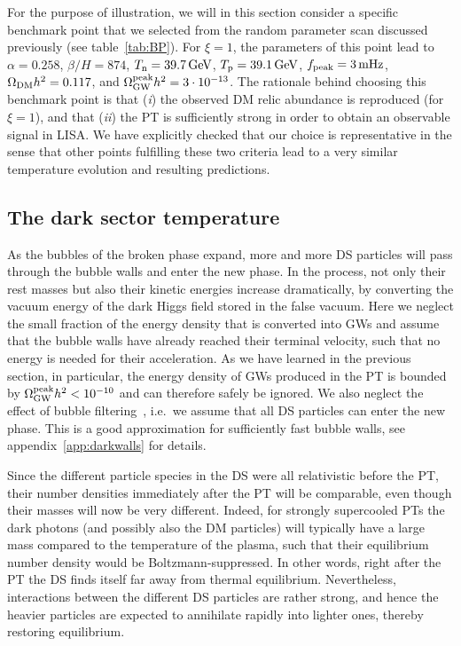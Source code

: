 For the purpose of illustration, we will in this section consider a specific benchmark point that we selected from the random parameter scan discussed previously (see table~\ref{tab:BP}). For $\xi=1$, the parameters of this point lead to $\alpha = 0.258$, $\beta/H=874$,
$T_{\text{n}}=39.7\,\text{GeV}$, $T_{\text{p}}=39.1\,\text{GeV}$, $f_{\text{peak}}=3\,\text{mHz}$, $\Omega_{\text{DM}} h^{2} = 0.117$, and $\Omega_{\text{GW}}^{\text{peak}} h^2=3\cdot10^{-13}$. The rationale behind  choosing this benchmark point is that (\textit{i}) the observed \ac{DM} relic abundance is reproduced (for $\xi = 1$), and that (\textit{ii}) the \ac{PT} is sufficiently strong in order to obtain an observable signal in \ac{LISA}. We have explicitly checked that our choice is representative in the sense that other points fulfilling these two criteria lead to a very similar temperature evolution and resulting predictions.

\subsection{The dark sector temperature}

As the bubbles of the broken phase expand, more and more \ac{DS} particles will pass through the bubble walls and enter the new phase. In the process, not only their rest masses but also their kinetic energies increase dramatically, by converting the vacuum energy of the dark Higgs field stored in the false vacuum. Here we neglect the small fraction of the energy density that is converted into \acp{GW} and assume that the bubble walls have already  reached their terminal velocity, such that no energy is needed for their acceleration. As we have learned in the previous section, in particular, the energy density of  \acp{GW} produced in the \ac{PT} is bounded by $\Omega_{\text{GW}}^{\text{peak}} h^2 < 10^{-10}$ and can therefore safely be ignored. We also neglect the effect of bubble filtering~\cite{Baker:2019ndr, Chway:2019kft}, i.e.~we assume that all \ac{DS} particles can enter the new phase. This is a good approximation for sufficiently fast bubble walls, see appendix~\ref{app:darkwalls} for details.

Since the different particle species in the \ac{DS} were all relativistic before the \ac{PT}, their number densities immediately after
the \ac{PT} will  be comparable, even though their masses will now be very different. Indeed, for strongly supercooled \acp{PT} the dark photons (and possibly also the \ac{DM} particles) will typically  have a large mass  compared to the temperature of the plasma, such that their equilibrium number density would be Boltzmann-suppressed. In other words, right after the \ac{PT} the \ac{DS} finds itself far away from thermal equilibrium. Nevertheless, interactions between the different \ac{DS} particles are rather strong, and hence the heavier particles are expected to annihilate rapidly into lighter ones, thereby restoring equilibrium.

